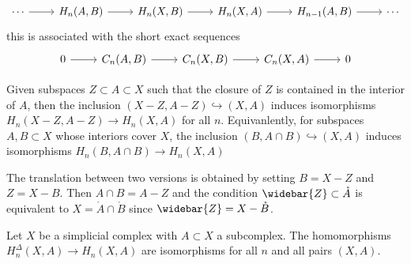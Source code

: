 \[\begin{tikzcd}
\cdots \ar[r] &H_n(A,B) \ar[r] &H_n(X,B)  \ar[r] &H_n(X,A) \ar[r] &H_{n-1}(A,B) \ar[r] &\cdots
\end{tikzcd}\]
this is associated with the short exact sequences
\[\begin{tikzcd}
0  \ar[r] &C_n(A,B) \ar[r] &C_n(X,B)  \ar[r] &C_n(X,A) \ar[r] &0
\end{tikzcd}\]
\begin{theorem}
Given subspaces $Z\subset A\subset X$ such that the closure of $Z$ is contained in the interior of $A$, then the inclusion $(X-Z,A-Z)\hookrightarrow(X,A)$ induces isomorphisms $H_n(X-Z,A-Z)\to H_n(X,A)$ for all $n$. Equivanlently, for subspaces $A,B\subset X$ whose interiors cover $X$, the inclusion $(B,A\cap B)\hookrightarrow(X,A)$ induces isomorphisms $H_n(B,A\cap B)\to H_n(X,A)$
\end{theorem}
The translation between two versions is obtained by setting $B=X-Z$ and $Z=X-B$. Then $A\cap B=A-Z$ and the condition $\widebar{Z}\subset\mathring{A}$ is equivalent to $X=\mathring{A}\cap\mathring{B}$ since $\widebar{Z}=X-\mathring{B}$.
\begin{theorem}
Let $X$ be a simplicial complex with $A\subset X$ a subcomplex. The homomorphisms $H_n^{\Delta}(X,A)\to H_n(X,A)$ are isomorphisms for all $n$ and all pairs $(X,A)$.
\end{theorem}
